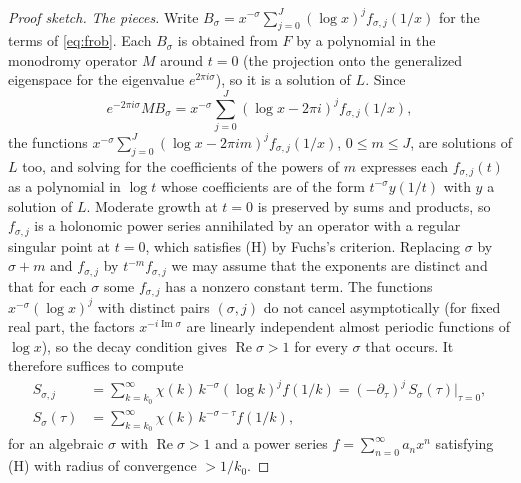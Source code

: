 \documentclass[11pt]{amsart}
\theoremstyle{definition}
\theoremstyle{remark}
\begin{document}
\begin{proof}[Proof sketch]
\emph{The pieces.} Write $B_\sigma = x^{-\sigma}\sum_{j=0}^{J}(\log x)^jf_{\sigma,j}(1/x)$ for the terms of \eqref{eq:frob}. Each
$B_\sigma$ is obtained from $F$ by a polynomial in the monodromy operator $M$ around $t = 0$ (the projection onto the
generalized eigenspace for the eigenvalue $e^{2\pi i\sigma}$), so it is a solution of $L$. Since
\[
  e^{-2\pi i\sigma}MB_\sigma = x^{-\sigma}\sum_{j=0}^{J}(\log x - 2\pi i)^jf_{\sigma,j}(1/x),
\]
the functions $x^{-\sigma}\sum_{j=0}^{J}(\log x - 2\pi i m)^jf_{\sigma,j}(1/x)$, $0 \le m \le J$, are solutions of $L$ too, and solving for the
coefficients of the powers of $m$ expresses each $f_{\sigma,j}(t)$ as a polynomial in $\log t$ whose coefficients are
of the form $t^{-\sigma}y(1/t)$ with $y$ a solution of $L$. Moderate growth at $t = 0$ is preserved by sums and
products, so $f_{\sigma,j}$ is a holonomic power series annihilated by an operator with a regular singular point at
$t = 0$, which satisfies (H) by Fuchs's criterion. Replacing $\sigma$ by $\sigma + m$ and $f_{\sigma,j}$ by
$t^{-m}f_{\sigma,j}$ we may assume that the exponents are distinct and that for each $\sigma$ some $f_{\sigma,j}$
has a nonzero constant term. The functions $x^{-\sigma}(\log x)^j$ with distinct pairs $(\sigma, j)$ do not cancel
asymptotically (for fixed real part, the factors $x^{-i\operatorname{Im}\sigma}$ are linearly independent almost
periodic functions of $\log x$), so the decay condition gives $\operatorname{Re}\sigma > 1$ for every $\sigma$ that occurs.
It therefore suffices to compute
\begin{align*}
  S_{\sigma,j} &= \sum_{k=k_0}^{\infty}\chi(k)\,k^{-\sigma}(\log k)^jf(1/k) = (-\partial_\tau)^j\, S_\sigma(\tau)\big|_{\tau=0},\\
  S_\sigma(\tau) &= \sum_{k=k_0}^{\infty}\chi(k)\,k^{-\sigma-\tau}f(1/k),
\end{align*}
for an algebraic $\sigma$ with $\operatorname{Re}\sigma > 1$ and a power series $f = \sum_{n=0}^{\infty}a_nx^n$ satisfying (H)
with radius of convergence $> 1/k_0$.


\end{proof}
\end{document}
